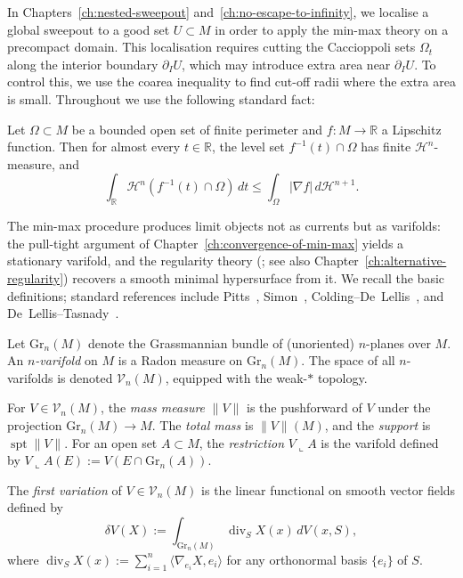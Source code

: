 In Chapters~\ref{ch:nested-sweepout} and~\ref{ch:no-escape-to-infinity}, we localise a global sweepout to a good set $U \subset M$ in order to apply the min-max theory on a precompact domain. This localisation requires cutting the Caccioppoli sets $\Omega_t$ along the interior boundary $\partial_I U$, which may introduce extra area near $\partial_I U$. To control this, we use the coarea inequality to find cut-off radii where the extra area is small. Throughout we use the following standard fact:

\begin{lemma}\label{lem:coarea}
Let $\Omega \subset M$ be a bounded open set of finite perimeter and $f\colon M \to \mathbb{R}$ a Lipschitz function. Then for almost every $t \in \mathbb{R}$, the level set $f^{-1}(t) \cap \Omega$ has finite $\mathcal{H}^n$-measure, and
\[
\int_{\mathbb{R}} \mathcal{H}^n(f^{-1}(t) \cap \Omega)\, dt \leq \int_\Omega |\nabla f|\, d\mathcal{H}^{n+1}.
\]
\end{lemma}

The min-max procedure produces limit objects not as currents but as varifolds: the pull-tight argument of Chapter~\ref{ch:convergence-of-min-max} yields a stationary varifold, and the regularity theory (\cite[Theorem~6.2]{LZ17}; see also Chapter~\ref{ch:alternative-regularity}) recovers a smooth minimal hypersurface from it. We recall the basic definitions; standard references include Pitts~\cite{Pit81}, Simon~\cite{Sim84}, Colding--De~Lellis~\cite{CL03}, and De~Lellis--Tasnady~\cite{DLT13}.

\begin{definition}[Varifolds]\label{def:varifold}
Let $\mathrm{Gr}_n(M)$ denote the Grassmannian bundle of (unoriented) $n$-planes over $M$. An \emph{$n$-varifold} on $M$ is a Radon measure on $\mathrm{Gr}_n(M)$. The space of all $n$-varifolds is denoted $\mathcal{V}_n(M)$, equipped with the weak-$*$ topology.

For $V \in \mathcal{V}_n(M)$, the \emph{mass measure} $\|V\|$ is the pushforward of $V$ under the projection $\mathrm{Gr}_n(M) \to M$. The \emph{total mass} is $\|V\|(M)$, and the \emph{support} is $\operatorname{spt}\|V\|$. For an open set $A \subset M$, the \emph{restriction} $V \llcorner A$ is the varifold defined by $V \llcorner A(E) := V(E \cap \mathrm{Gr}_n(A))$.
\end{definition}

\begin{definition}\label{def:first-variation}
The \emph{first variation} of $V \in \mathcal{V}_n(M)$ is the linear functional on smooth vector fields defined by
\[
\delta V(X) := \int_{\mathrm{Gr}_n(M)} \operatorname{div}_S X(x) \, dV(x, S),
\]
where $\operatorname{div}_S X(x) := \sum_{i=1}^n \langle \nabla_{e_i} X, e_i \rangle$ for any orthonormal basis $\{e_i\}$ of $S$.
\end{definition}

